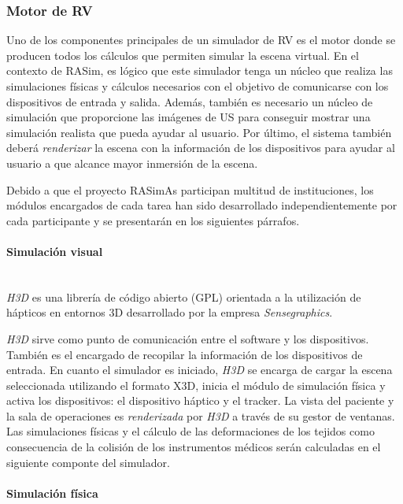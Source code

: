 \subsubsection{Motor de \ac{RV}}

Uno de los componentes principales de un simulador de \ac{RV} es el motor donde se producen todos los cálculos que permiten simular la escena virtual. 
En el contexto de \ac{RASim}, es lógico que este simulador tenga un núcleo que realiza las simulaciones físicas y cálculos necesarios con el objetivo de comunicarse con los dispositivos de entrada y salida. Además, también es necesario un núcleo de simulación que proporcione las imágenes de \ac{US} para conseguir mostrar una simulación realista que pueda ayudar al usuario. Por último, el sistema también deberá \emph{renderizar} la escena con la información de los dispositivos para ayudar al usuario a que alcance mayor inmersión de la escena. 

Debido a que el proyecto \ac{RASimAs} participan multitud de instituciones, los módulos encargados de cada tarea han sido desarrollado independientemente por cada participante y se presentarán en los siguientes párrafos.

\paragraph{Simulación visual}\mbox{}\\

\emph{H3D}\cite{asdf} es una librería de código abierto (\ac{GPL})  orientada a la utilización de hápticos en entornos 3D desarrollado por la empresa \emph{Sensegraphics}. 

\emph{H3D} sirve como punto de comunicación entre el software y los dispositivos. También es el encargado de recopilar la información de los dispositivos de entrada.
En cuanto el simulador es iniciado, \emph{H3D} se encarga de cargar la escena seleccionada utilizando el formato \ac{X3D}, inicia el módulo de simulación física y activa los dispositivos:  el dispositivo háptico y el \ac{tracker}. La vista del paciente y la sala de operaciones es \emph{renderizada} por \emph{H3D} a través de su gestor de ventanas. Las simulaciones físicas y el cálculo de las deformaciones de los tejidos como consecuencia de la colisión de los instrumentos médicos serán calculadas en el siguiente componte del simulador.

\paragraph{Simulación física}\mbox{}\\

